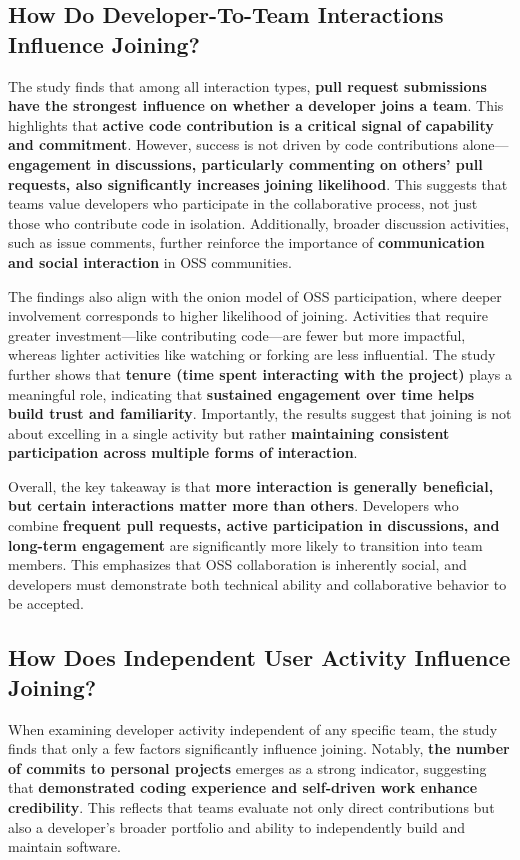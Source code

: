 \subsection{How Do Developer-To-Team Interactions Influence Joining?}

The study finds that among all interaction types, \textbf{pull request submissions have the strongest influence on whether a developer joins a team}. This highlights that \textbf{active code contribution is a critical signal of capability and commitment}. However, success is not driven by code contributions alone—\textbf{engagement in discussions, particularly commenting on others’ pull requests, also significantly increases joining likelihood}. This suggests that teams value developers who participate in the collaborative process, not just those who contribute code in isolation. Additionally, broader discussion activities, such as issue comments, further reinforce the importance of \textbf{communication and social interaction} in OSS communities.

The findings also align with the onion model of OSS participation, where deeper involvement corresponds to higher likelihood of joining. Activities that require greater investment—like contributing code—are fewer but more impactful, whereas lighter activities like watching or forking are less influential. The study further shows that \textbf{tenure (time spent interacting with the project)} plays a meaningful role, indicating that \textbf{sustained engagement over time helps build trust and familiarity}. Importantly, the results suggest that joining is not about excelling in a single activity but rather \textbf{maintaining consistent participation across multiple forms of interaction}.

Overall, the key takeaway is that \textbf{more interaction is generally beneficial, but certain interactions matter more than others}. Developers who combine \textbf{frequent pull requests, active participation in discussions, and long-term engagement} are significantly more likely to transition into team members. This emphasizes that OSS collaboration is inherently social, and developers must demonstrate both technical ability and collaborative behavior to be accepted.

\subsection{How Does Independent User Activity Influence Joining?}
When examining developer activity independent of any specific team, the study finds that only a few factors significantly influence joining. Notably, \textbf{the number of commits to personal projects} emerges as a strong indicator, suggesting that \textbf{demonstrated coding experience and self-driven work enhance credibility}. This reflects that teams evaluate not only direct contributions but also a developer’s broader portfolio and ability to independently build and maintain software.

